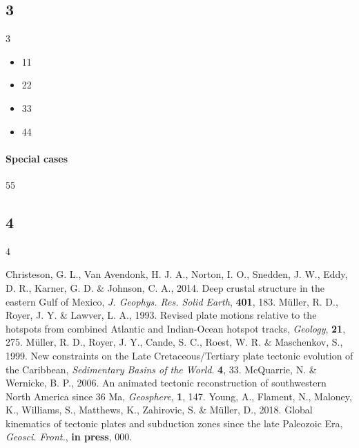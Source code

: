 \subsection{3}
3

\begin{itemize}
\item 11
\item 22
\item 33
\item 44
\end{itemize}

\paragraph{Special cases} 55

\subsection{4}
4

\begin{thebibliography}{}
  Christeson, G. L., Van Avendonk, H. J. A., Norton, I. O., Snedden, J. W.,
  Eddy, D. R., Karner, G. D. \& Johnson, C. A., 2014. Deep crustal structure in
  the eastern Gulf of Mexico, \textit{J. Geophys. Res. Solid Earth},
  \textbf{401}, 183.
  M{\"{u}}ller, R. D., Royer, J. Y. \& Lawver, L. A., 1993. Revised plate
  motions relative to the hotspots from combined Atlantic and Indian-Ocean
  hotspot tracks, \textit{Geology}, \textbf{21}, 275.
  M{\"{u}}ller, R. D., Royer, J. Y., Cande, S. C., Roest, W. R. \& Maschenkov,
  S., 1999. New constraints on the Late Cretaceous/Tertiary plate tectonic
  evolution of the Caribbean, \textit{Sedimentary Basins of the World}.
  \textbf{4}, 33.
  McQuarrie, N. \& Wernicke, B. P., 2006. An animated tectonic reconstruction of
  southwestern North America since 36 Ma, \textit{Geosphere}, \textbf{1},
  147.
  Young, A., Flament, N., Maloney, K., Williams, S., Matthews, K., Zahirovic,
  S.
  \& Müller, D., 2018. Global kinematics of tectonic plates and subduction zones
  since the late Paleozoic Era, \textit{Geosci. Front.},
  \textbf{in press}, 000.
\end{thebibliography}\label{lastpage}
